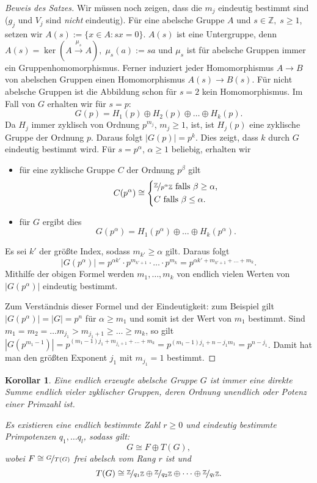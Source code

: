 \documentclass[12pt]{scrartcl} %
\newcommand\Z{\mathbb{Z}}
\newtheorem{kor}[thm]{Korollar}
\theoremstyle{definition}
\theoremstyle{remark}
\begin{document}
\begin{proof}[Beweis des Satzes]
        Wir müssen noch zeigen, dass die $m_j$ eindeutig bestimmt sind ($g_j$ und $V_j$ sind \emph{nicht} eindeutig). Für eine abelsche Gruppe $A$ und $s\in\mathbb{Z},\; s\geq 1$, setzen wir $A(s) := \{x\in A:sx=0\}$. $A(s)$ ist eine Untergruppe, denn $A(s) = \ker(A \overset{\mu_s}{\to} A),\;\mu_s(a):=sa$ und $\mu_s$ ist für abelsche Gruppen immer ein Gruppenhomomorphismus. Ferner induziert jeder Homomorphismus $A\to B$ von abelschen Gruppen einen Homomorphismus $A(s)\to B(s)$. Für nicht abelsche Gruppen ist die Abbildung schon für $s=2$ kein Homomorphismus. Im Fall von $G$ erhalten wir für $s=p$:
	\[ G(p) = H_1(p)\oplus H_2(p)\oplus\dots\oplus H_k(p).\]
	Da $H_j$ immer zyklisch von Ordnung $p^{m_j}$, $m_j\geq 1$, ist, ist $H_j(p)$ eine zyklische Gruppe der Ordnung $p$. Daraus folgt $|G(p)|=p^k$. Dies zeigt, dass $k$ durch $G$ eindeutig bestimmt wird. Für $s=p^{\alpha}$, $\alpha\geq 1$ beliebig, erhalten wir
	\begin{itemize}
		\item für eine zyklische Gruppe $C$ der Ordnung $p^{\beta}$ gilt
			\[ C(p^{\alpha})\cong \begin{dcases}
 				\nicefrac{\mathbb{Z}}{p^{\alpha}\mathbb{Z}}\text{ falls $\beta\geq\alpha$,} \\
 				C\text{ falls $\beta\leq\alpha$.}
 \end{dcases}\]
		\item für $G$ ergibt dies
			\[G(p^{\alpha})=H_1(p^{\alpha})\oplus\dots\oplus H_k(p^{\alpha}).\]
	\end{itemize}
	Es sei $k'$ der größte Index, sodass $m_{k'}\geq\alpha$ gilt. Daraus folgt
	\[|G(p^{\alpha})|=p^{\alpha k'}\cdot p^{m_{k'+1}}\cdot\dots\cdot p^{m_k} = p^{\alpha k'+m_{k'+1}+\dots+m_k}.\]
	Mithilfe der obigen Formel werden $m_1,\dots,m_k$ von endlich vielen Werten von $|G(p^{\alpha})|$ eindeutig bestimmt.
	
	Zum Verständnis dieser Formel und der Eindeutigkeit: zum Beispiel gilt $|G(p^{\alpha})|=|G|=p^n$ für $\alpha\geq m_1$ und somit ist der Wert von $m_1$ bestimmt. Sind $m_1=m_2=\dots m_{j_1}>m_{j_1+1}\geq\dots\geq m_k$, so gilt $|G(p^{m_1-1})|=p^{(m_1-1)j_1+m_{j_1+1}+\dots+m_k}=p^{(m_1-1)j_1+n-j_1m_1} = p^{n-j_1}$. Damit hat man den größten Exponent $j_1$ mit $m_{j_1}=1$ bestimmt.
\end{proof}

\begin{kor}
	Eine endlich erzeugte abelsche Gruppe $G$ ist immer eine direkte Summe endlich vieler zyklischer Gruppen, deren Ordnung unendlich oder Potenz einer Primzahl ist.
	
	Es existieren eine endlich bestimmte Zahl $r\geq 0$ und eindeutig bestimmte Primpotenzen $q_1,\dots q_l$, sodass gilt:
	\[ G\cong F\oplus T(G), \]
wobei $F\cong \nicefrac{G}{T(G)}$ frei abelsch vom Rang $r$ ist und 
	\[ T(G) \cong \nicefrac{\Z}{q_1\Z}\oplus\nicefrac{\Z}{q_2\Z}\oplus\dots\oplus\nicefrac{\Z}{q_l\Z}.\]
\end{kor}
\end{document}
